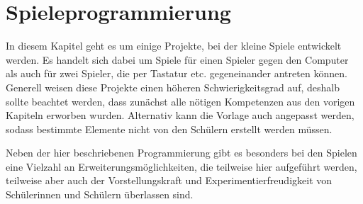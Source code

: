 \chapter{Spieleprogrammierung}

In diesem Kapitel geht es um einige Projekte, bei der kleine Spiele entwickelt werden. Es handelt sich dabei um Spiele für einen Spieler gegen den Computer als auch für zwei Spieler, die per Tastatur etc. gegeneinander antreten können. Generell weisen diese Projekte einen höheren Schwierigkeitsgrad auf, deshalb sollte beachtet werden, dass zunächst alle nötigen Kompetenzen aus den vorigen Kapiteln erworben wurden. Alternativ kann die Vorlage auch angepasst werden, sodass bestimmte Elemente nicht von den Schülern erstellt werden müssen.

Neben der hier beschriebenen Programmierung gibt es besonders bei den Spielen eine Vielzahl an Erweiterungsmöglichkeiten, die teilweise hier aufgeführt werden, teilweise aber auch der Vorstellungskraft und Experimentierfreudigkeit von Schülerinnen und Schülern überlassen sind.


